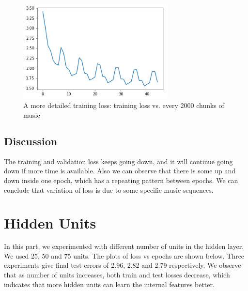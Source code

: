 \documentclass{article}
\begin{document}
\begin{figure}[h]
\centering
\includegraphics[width=0.7\textwidth]{pics/every_2000_train_loss.png}
\caption{A more detailed training loss: training loss vs. every 2000 chunks of music}
\end{figure}
\subsection{Discussion}
The training and validation loss keeps going down, and it will continue going down if more time is available. Also we can observe that there is some up and down inside one epoch, which has a repeating pattern between epochs. We can conclude that variation of loss is due to some specific music sequences.  
\newpage


\section{Hidden Units}
In this part, we experimented with different number of units in the hidden layer. We used 25, 50 and 75 units. The plots of loss vs epochs are shown below. Three experiments give final test errors of 2.96, 2.82 and 2.79 respectively. We observe that as number of units increases, both train and test losses decrease, which indicates that more hidden units can learn the internal features better. 
\end{document}
